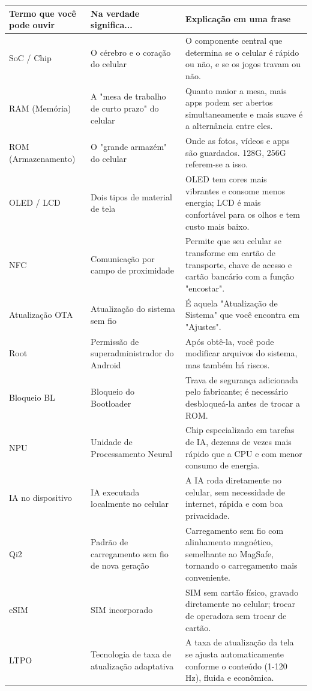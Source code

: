 
\begin{center}
\begin{tabularx}{\linewidth}{|X|X|X|}
\hline
\textbf{Termo que você pode ouvir} & \textbf{Na verdade significa...} & \textbf{Explicação em uma frase} \tabularnewline
\hline
SoC / Chip & O cérebro e o coração do celular & O componente central que determina se o celular é rápido ou não, e se os jogos travam ou não. \tabularnewline
RAM (Memória) & A "mesa de trabalho de curto prazo" do celular & Quanto maior a mesa, mais apps podem ser abertos simultaneamente e mais suave é a alternância entre eles. \tabularnewline
ROM (Armazenamento) & O "grande armazém" do celular & Onde as fotos, vídeos e apps são guardados. 128G, 256G referem-se a isso. \tabularnewline
OLED / LCD & Dois tipos de material de tela & OLED tem cores mais vibrantes e consome menos energia; LCD é mais confortável para os olhos e tem custo mais baixo. \tabularnewline
NFC & Comunicação por campo de proximidade & Permite que seu celular se transforme em cartão de transporte, chave de acesso e cartão bancário com a função "encostar". \tabularnewline
Atualização OTA & Atualização do sistema sem fio & É aquela "Atualização de Sistema" que você encontra em "Ajustes". \tabularnewline
Root & Permissão de superadministrador do Android & Após obtê-la, você pode modificar arquivos do sistema, mas também há riscos. \tabularnewline
Bloqueio BL & Bloqueio do Bootloader & Trava de segurança adicionada pelo fabricante; é necessário desbloqueá-la antes de trocar a ROM. \tabularnewline
NPU & Unidade de Processamento Neural & Chip especializado em tarefas de IA, dezenas de vezes mais rápido que a CPU e com menor consumo de energia. \tabularnewline
IA no dispositivo & IA executada localmente no celular & A IA roda diretamente no celular, sem necessidade de internet, rápida e com boa privacidade. \tabularnewline
Qi2 & Padrão de carregamento sem fio de nova geração & Carregamento sem fio com alinhamento magnético, semelhante ao MagSafe, tornando o carregamento mais conveniente. \tabularnewline
eSIM & SIM incorporado & SIM sem cartão físico, gravado diretamente no celular; trocar de operadora sem trocar de cartão. \tabularnewline
LTPO & Tecnologia de taxa de atualização adaptativa & A taxa de atualização da tela se ajusta automaticamente conforme o conteúdo (1-120 Hz), fluida e econômica. \tabularnewline
\hline
\end{tabularx}
\end{center}
